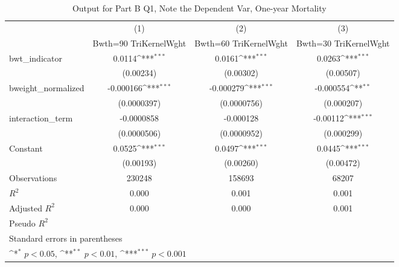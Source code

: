 \documentclass{article}
\begin{document}
\begin{table}[H]\centering
\def\sym#1{\ifmmode^{#1}\else\(^{#1}\)\fi}
\caption{Output for Part B Q1, Note the Dependent Var, One-year Mortality \label{bq1}}
\begin{tabular}{l*{3}{c}}
\toprule
                    &\multicolumn{1}{c}{(1)}&\multicolumn{1}{c}{(2)}&\multicolumn{1}{c}{(3)}\\
                    &\multicolumn{1}{c}{Bwth=90 TriKernelWght}&\multicolumn{1}{c}{Bwth=60 TriKernelWght}&\multicolumn{1}{c}{Bwth=30 TriKernelWght}\\
\midrule
bwt\_indicator       &      0.0114\sym{***}&      0.0161\sym{***}&      0.0263\sym{***}\\
                    &   (0.00234)         &   (0.00302)         &   (0.00507)         \\
\addlinespace
bweight\_normalized  &   -0.000166\sym{***}&   -0.000279\sym{***}&   -0.000554\sym{**} \\
                    & (0.0000397)         & (0.0000756)         &  (0.000207)         \\
\addlinespace
interaction\_term    &  -0.0000858         &   -0.000128         &    -0.00112\sym{***}\\
                    & (0.0000506)         & (0.0000952)         &  (0.000299)         \\
\addlinespace
Constant            &      0.0525\sym{***}&      0.0497\sym{***}&      0.0445\sym{***}\\
                    &   (0.00193)         &   (0.00260)         &   (0.00472)         \\
\midrule
Observations        &      230248         &      158693         &       68207         \\
\(R^{2}\)           &       0.000         &       0.001         &       0.001         \\
Adjusted \(R^{2}\)  &       0.000         &       0.000         &       0.001         \\
Pseudo \(R^{2}\)    &                     &                     &                     \\
\bottomrule
\multicolumn{4}{l}{\footnotesize Standard errors in parentheses}\\
\multicolumn{4}{l}{\footnotesize \sym{*} \(p<0.05\), \sym{**} \(p<0.01\), \sym{***} \(p<0.001\)}\\
\end{tabular}
\end{table}
\end{document}
